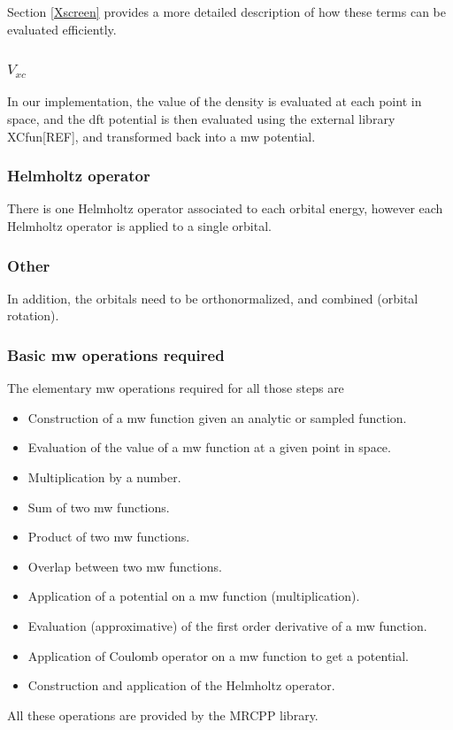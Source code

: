 \documentclass{article}
\begin{document}
Section \ref{Xscreen} provides a more detailed description of how these terms can be evaluated efficiently. 

\subsubsection{$V_{xc}$}
In our implementation, the value of the density is evaluated at each point in space, and the dft potential is then evaluated using the external library XCfun[REF], and transformed back into a mw potential. 

\subsubsection{Helmholtz operator}

There is one Helmholtz operator associated to each orbital energy, however each Helmholtz operator is applied to a single orbital.

\subsubsection{Other}
In addition, the orbitals need to be orthonormalized, and combined (orbital rotation).

\subsubsection{Basic mw operations required}

The elementary mw operations required for all those steps are
\begin{itemize}
\item Construction of a mw function given an analytic or sampled function.
\item Evaluation of the value of a mw function at a given point in space.
\item Multiplication by a number.
\item Sum of two mw functions.
\item Product of two mw functions.
\item Overlap between two mw functions.
\item Application of a potential on a mw function (multiplication).
\item Evaluation (approximative) of the first order derivative of a mw function.
\item Application of Coulomb operator on a mw function to get a potential.
\item Construction and application of the Helmholtz operator.
\end{itemize}
All these operations are provided by the MRCPP library.
\end{document}
